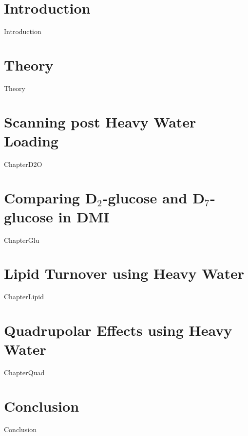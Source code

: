 \documentclass[12pt,english]{report}
\begin{document}
\newpage
\mbox{}

\chapter{Introduction}
\setcounter{page}{1}

\fancyhead[RO]{\color{gray} \nouppercase{\rightmark}}
\fancyhead[LE]{\color{gray} \nouppercase{\leftmark}}

{Introduction}

\chapter{Theory}
{Theory}

\chapter{Scanning post Heavy Water Loading}
{ChapterD2O}

\chapter{Comparing D$_2$-glucose and D$_7$-glucose in DMI}
{ChapterGlu}

\chapter{Lipid Turnover using Heavy Water}
{ChapterLipid}

\chapter{Quadrupolar Effects using Heavy Water}
{ChapterQuad}

\chapter{Conclusion}
{Conclusion}

\newpage

\printbibliography
\end{document}

